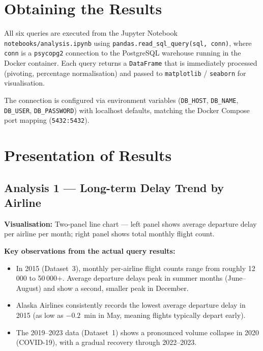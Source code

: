 \documentclass[12pt,a4paper]{article}
\begin{document}
\section{Obtaining the Results}

All six queries are executed from the Jupyter Notebook
\texttt{notebooks/analysis.ipynb} using \texttt{pandas.read\_sql\_query(sql, conn)},
where \texttt{conn} is a \texttt{psycopg2} connection to the PostgreSQL
warehouse running in the Docker container. Each query returns a
\texttt{DataFrame} that is immediately processed (pivoting, percentage
normalisation) and passed to \texttt{matplotlib} / \texttt{seaborn} for
visualisation.

The connection is configured via environment variables
(\texttt{DB\_HOST}, \texttt{DB\_NAME}, \texttt{DB\_USER},
\texttt{DB\_PASSWORD}) with localhost defaults, matching the Docker Compose
port mapping (\texttt{5432:5432}).

\section{Presentation of Results}

\subsection{Analysis 1 — Long-term Delay Trend by Airline}

\textbf{Visualisation:} Two-panel line chart — left panel shows average
departure delay per airline per month; right panel shows total monthly flight
count.

\textbf{Key observations from the actual query results:}

\begin{itemize}
    \item In 2015 (Dataset~3), monthly per-airline flight counts range from
          roughly 12\,000 to 50\,000+. Average departure delays peak in
          summer months (June–August) and show a second, smaller peak in
          December.
    \item Alaska Airlines consistently records the lowest average departure
          delay in 2015 (as low as $-0.2$~min in May, meaning flights
          typically depart early).
    \item The 2019–2023 data (Dataset~1) shows a pronounced volume collapse
          in 2020 (COVID-19), with a gradual recovery through 2022–2023.
\end{itemize}
\end{document}
